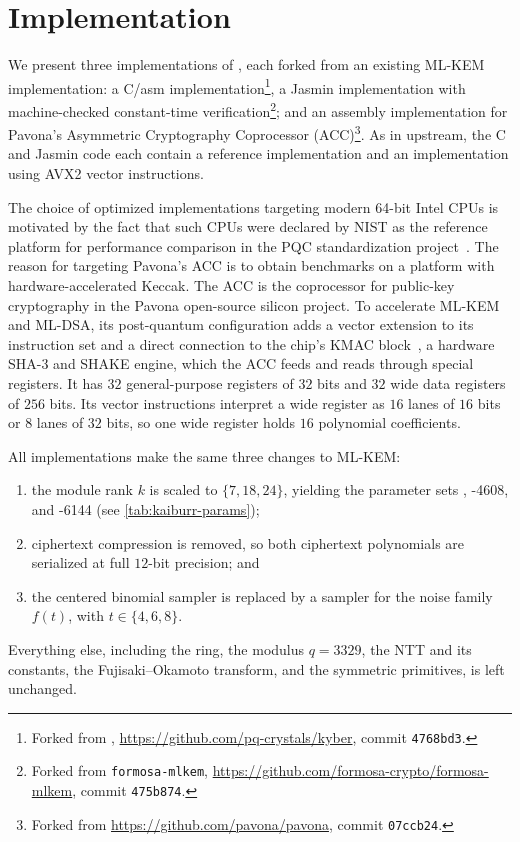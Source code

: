 \section{Implementation}
\label{sec:implementation}

We present three implementations of \kaiburr, each forked from an existing ML-KEM implementation: 
a C/asm implementation\footnote{Forked from \kyber, \url{https://github.com/pq-crystals/kyber}, commit \texttt{4768bd3}.},
a Jasmin implementation with machine-checked constant-time verification\footnote{Forked from \texttt{formosa-mlkem}, \url{https://github.com/formosa-crypto/formosa-mlkem}, commit \texttt{475b874}.};
and an assembly implementation for Pavona's Asymmetric Cryptography Coprocessor (ACC)\footnote{Forked from \url{https://github.com/pavona/pavona}, commit \texttt{07ccb24}.}.
As in upstream, the C and Jasmin code each contain a reference implementation
and an implementation using AVX2 vector instructions. 

The choice of optimized implementations targeting modern 64-bit Intel CPUs is motivated by
the fact that such CPUs were declared by NIST as the reference platform for performance comparison
in the PQC standardization project~\cite{pqcfp}. 
The reason for targeting Pavona's ACC is to obtain benchmarks on a platform with
hardware-accelerated Keccak.
The ACC is the coprocessor for public-key cryptography in the Pavona open-source silicon project. To accelerate
ML-KEM and ML-DSA, its post-quantum configuration adds a vector extension to its instruction set and a direct connection
to the chip's KMAC block~\cite{SP:AOPPSS25,TCHES:NiePha26}, a hardware SHA-3 and SHAKE engine, which the ACC feeds and
reads through special registers. It has $32$ general-purpose
registers of $32$ bits and $32$ wide data registers of $256$ bits. Its vector instructions interpret a wide register as
$16$ lanes of $16$ bits or $8$ lanes of $32$ bits, so one wide register holds $16$ polynomial coefficients. 

All implementations make the same three changes to ML-KEM:
\begin{enumerate}
  \item the module rank $k$ is scaled to $\{7,18,24\}$, yielding the parameter
        sets , -4608, and -6144 (see
        \cref{tab:kaiburr-params});
  \item ciphertext compression is removed, so both ciphertext polynomials are
        serialized at full $12$-bit precision; and
  \item the centered binomial sampler is replaced by a sampler for the noise
        family $f(t)$, with $t\in\{4,6,8\}$.
\end{enumerate}
Everything else, including the ring, the modulus $q=3329$, the NTT and its constants,
the Fujisaki--Okamoto transform, and the symmetric primitives, is left
unchanged.


